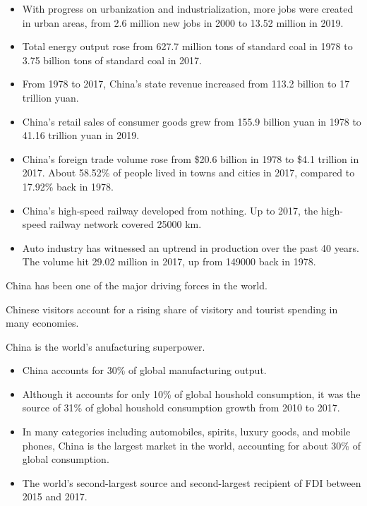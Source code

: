 \begin{itemize}
    \item With progress on urbanization and industrialization, more jobs
        were created in urban areas, from 2.6 million new jobs in 2000 to
        13.52 million in 2019.
    \item Total energy output rose from 627.7 million tons of standard coal
        in 1978 to 3.75 billion tons of standard coal in 2017.
    \item From 1978 to 2017, China's state revenue increased from 113.2 billion
        to 17 trillion yuan.
    \item China's retail sales of consumer goods grew from 155.9 billion yuan
        in 1978 to 41.16 trillion yuan in 2019.
    \item China's foreign trade volume rose from \$20.6 billion in 1978 to
        \$4.1 trillion in 2017. About 58.52\% of people lived in towns and
        cities in 2017, compared to 17.92\% back in 1978.
    \item China's high-speed railway developed from nothing. Up to 2017, the
        high-speed railway network covered 25000 km.
    \item Auto industry has witnessed an uptrend in production over the past
        40 years. The volume hit 29.02 million in 2017, up from 149000 back
        in 1978.
\end{itemize}

China has been one of the major driving forces in the world.

\vspace{1\baselineskip}

Chinese visitors account for a rising share of visitory and tourist spending
in many economies.

\vspace{1\baselineskip}

China is the world's anufacturing superpower.

\begin{itemize}
    \item China accounts for 30\% of global manufacturing output.
    \item Although it accounts for only 10\% of global houshold consumption,
        it was the source of 31\% of global houshold consumption growth from
        2010 to 2017.
    \item In many categories including automobiles, spirits, luxury goods,
        and mobile phones, China is the largest market in the world,
        accounting for about 30\% of global consumption.
    \item The world's second-largest source and second-largest recipient
        of FDI between 2015 and 2017.
\end{itemize}

